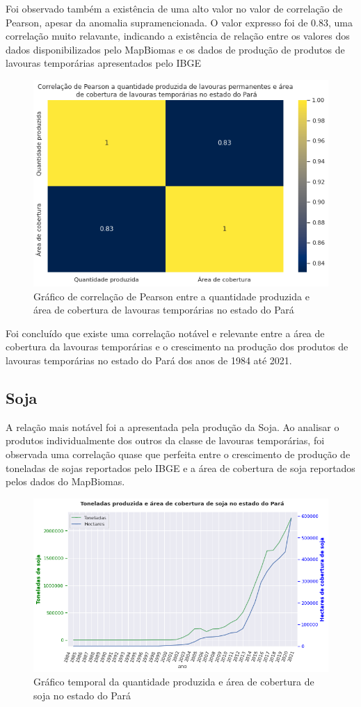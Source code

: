 Foi observado também a existência de uma alto valor no valor de correlação de Pearson, apesar da anomalia supramencionada. O valor expresso foi de 0.83, uma correlação muito relavante, indicando a existência de relação entre os valores dos dados disponibilizados pelo MapBiomas e os dados de produção de produtos de lavouras temporárias apresentados pelo IBGE

\begin{figure}[hbt!]
    \centering
    \includegraphics[width=0.6\columnwidth]{src/plots/plot_correlacao-lavouras_temp.png}
    \centering
    \caption{Gráfico de correlação de Pearson entre a quantidade produzida e área de cobertura de lavouras temporárias no estado do Pará}
    \label{fig:correlacao-cobertura_pastagem-numero_cabecas}
\end{figure}

Foi concluído que existe uma correlação notável e relevante entre a área de cobertura da lavouras temporárias e o crescimento na produção dos produtos de lavouras temporárias no estado do Pará dos anos de 1984 até 2021.





\subsection{Soja}

A relação mais notável foi a apresentada pela produção da Soja. Ao analisar o produtos individualmente dos outros da classe de lavouras temporárias, foi observada uma correlação quase que perfeita entre o crescimento de produção de toneladas de sojas reportados pelo IBGE e a área de cobertura de soja reportados pelos dados do MapBiomas.


\begin{figure}[hbt!]
    \centering
    \includegraphics[width=0.6\columnwidth]{src/plots/plot-soja.png}
    \centering
    \caption{Gráfico temporal da quantidade produzida e área de cobertura de soja no estado do Pará}
    \label{fig:cobertura_pastagem-numero_cabeca}
\end{figure}


